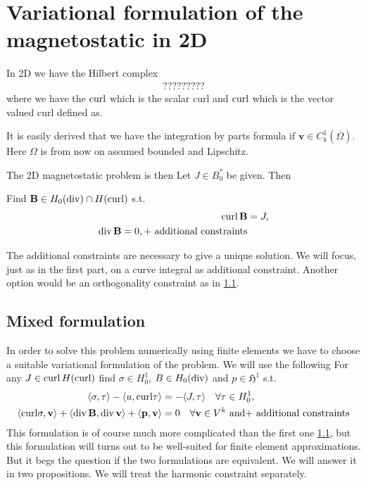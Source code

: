 \documentclass[../master_thesis.tex]{subfiles}
\begin{document}
\section{Variational formulation of the magnetostatic in 2D}

In 2D we have the Hilbert complex 
\begin{align*}
    ?????????
\end{align*}
where we have the $\operatorname{curl}$ which is the scalar curl and 
$\mathbf{\operatorname{curl}}$ which is the vector valued curl defined as.

It is easily derived that we have the integration by parts formula if $\mathbf{v} \in C_b^1(\overline{\Omega})$.
Here $\Omega$ is from now on assumed bounded and Lipschitz.

The 2D magnetostatic problem is then
Let $J \in B^*_0$ be given. Then
\begin{problem}
    Find $\mathbf{B} \in H_0(\operatorname{div}) \cap H(\operatorname{curl})$ s.t.
    \begin{align*}
        \operatorname{curl} \mathbf{B} &= J,
        \\ \operatorname{div} \mathbf{B} = 0,
        \text{+ additional constraints}
    \end{align*}
\end{problem}
The additional constraints are necessary to give a unique solution. 
We will focus, just as in the first part, on 
a curve integral as additional constraint. 
Another option would be an orthogonality constraint as in \ref{}.

\subsection{Mixed formulation}
In order to solve this problem numerically using finite elements we have to 
choose a suitable variational formulation of the problem. We will use the following
For any $J \in \operatorname{curl} H(\operatorname{curl})$ find $\sigma \in H^1_0$, 
$B \in H_0(\operatorname{div})$ and $p \in \mathfrak{H}^1$ s.t.
\begin{align}
    \langle \sigma, \tau \rangle - \langle u, \mathbf{\operatorname{curl}}\tau \rangle 
        &=  -\langle J, \tau \rangle \quad \forall \tau \in H^1_0, \label{eq:first_eq_mixed_formulation}
    \\ \langle \mathbf{\operatorname{curl}}\sigma, \mathbf{v} \rangle + \langle \operatorname{div} \mathbf{B}, \operatorname{div} \mathbf{v} \rangle 
        + \langle \mathbf{p}, \mathbf{v} \rangle 
        &= 0 \quad \forall \mathbf{v} \in V^k \text{ and} \label{eq:second_eq_mixed_formulation}
        \text{+ additional constraints}
\end{align} 
This formulation is of course much more complicated than the first one \ref{}, 
but this formulation will turns out to be well-suited for finite element approximations.
But it begs the question if the two formulations are equivalent. We will answer it 
in two propositions. We will treat the harmonic constraint separately.
\end{document}
